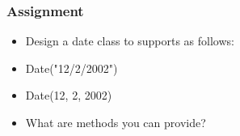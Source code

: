 \documentclass[14pt]{beamer}
\begin{document}
    \begin{frame}[containsverbatim]
        \frametitle{Assignment}
        \begin{itemize}
        \item Design a date class to supports as follows:
        \item Date("12/2/2002")
        \item Date(12, 2, 2002)
        \item What are methods you can provide?
        \end{itemize}
    \end{frame}
\end{document}
